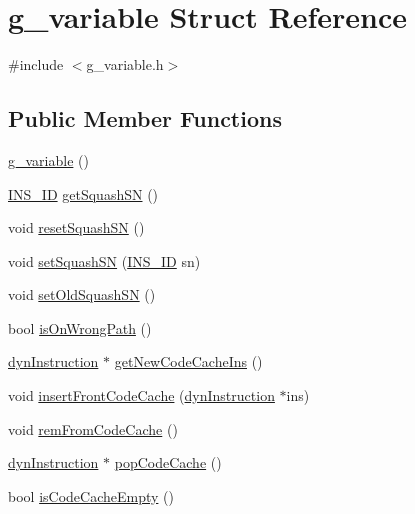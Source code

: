 \hypertarget{structg__variable}{
\section{g\_\-variable Struct Reference}
\label{structg__variable}
}


{\ttfamily \#include $<$g\_\-variable.h$>$}

\subsection*{Public Member Functions}
\begin{DoxyCompactItemize}
\item 
\hyperlink{structg__variable_a0b12751ab1f92b2345771c45290fc19e}{g\_\-variable} ()
\item 
\hyperlink{global_2global_8h_a1883c47d0023d0f200e1d86eced6a070}{INS\_\-ID} \hyperlink{structg__variable_a366fb213b96fa81e166dbe60a16c3e4f}{getSquashSN} ()
\item 
void \hyperlink{structg__variable_a0031c2dbd6463bf57b4d24335eb7b9ca}{resetSquashSN} ()
\item 
void \hyperlink{structg__variable_a3bbe6f8c101d665e05c30ef1eb7c9a16}{setSquashSN} (\hyperlink{global_2global_8h_a1883c47d0023d0f200e1d86eced6a070}{INS\_\-ID} sn)
\item 
void \hyperlink{structg__variable_adc6b682b4875fa3af7d390099c93dc88}{setOldSquashSN} ()
\item 
bool \hyperlink{structg__variable_afb2439358b8c746fc28eaadb0ac77b10}{isOnWrongPath} ()
\item 
\hyperlink{classdynInstruction}{dynInstruction} $\ast$ \hyperlink{structg__variable_a8ba648162a8abae37194625703d094c9}{getNewCodeCacheIns} ()
\item 
void \hyperlink{structg__variable_ac6cd30370c34c5a0862aa9a4c56049db}{insertFrontCodeCache} (\hyperlink{classdynInstruction}{dynInstruction} $\ast$ins)
\item 
void \hyperlink{structg__variable_ab351194ce2a3de088813ae861c7e3d10}{remFromCodeCache} ()
\item 
\hyperlink{classdynInstruction}{dynInstruction} $\ast$ \hyperlink{structg__variable_abb078ae60bb65db485a0cc2382bd4457}{popCodeCache} ()
\item 
bool \hyperlink{structg__variable_a4b5f6627f388c34df7af5168a119778d}{isCodeCacheEmpty} ()
\end{DoxyCompactItemize}
